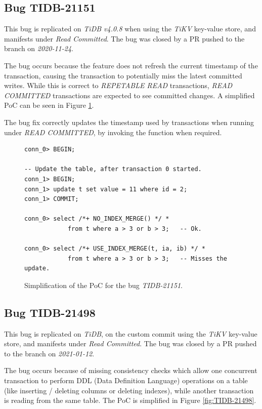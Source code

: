 \subsection*{Bug TIDB-21151}

This bug is replicated on \textit{TiDB v4.0.8} when using the \textit{TiKV} key-value store, and manifests under \textit{Read Committed}. The bug was closed by a PR pushed to the  branch on \textit{2020-11-24}.

The bug occurs because the  feature does not refresh the current timestamp of the transaction, causing the transaction to potentially miss the latest committed writes. While this is correct to \textit{REPETABLE READ} transactions, \textit{READ COMMITTED} transactions are expected to see committed changes. A simplified PoC can be seen in Figure \ref{fig:TIDB-21151}. 

The bug fix correctly updates the timestamp used by transactions when running under \textit{READ COMMITTED}, by invoking the  function when required.

\begin{figure}
\begin{verbatim}
conn_0> BEGIN;

-- Update the table, after transaction 0 started.
conn_1> BEGIN;
conn_1> update t set value = 11 where id = 2;
conn_1> COMMIT;

conn_0> select /*+ NO_INDEX_MERGE() */ *
            from t where a > 3 or b > 3;   -- Ok.

conn_0> select /*+ USE_INDEX_MERGE(t, ia, ib) */ *
            from t where a > 3 or b > 3;   -- Misses the update.
\end{verbatim}
\caption{Simplification of the PoC for the bug \textit{TIDB-21151}.} \label{fig:TIDB-21151}
\end{figure}

\subsection*{Bug TIDB-21498}

This bug is replicated on \textit{TiDB}, on the custom commit  using the \textit{TiKV} key-value store, and manifests under \textit{Read Committed}. The bug was closed by a PR pushed to the  branch on \textit{2021-01-12}.

The bug occurs because of missing consistency checks which allow one concurrent transaction to perform DDL (Data Definition Language) operations on a table (like inserting / deleting columns or deleting indexes), while another transaction is reading from the same table. The PoC is simplified in Figure \ref{fig:TIDB-21498}.

